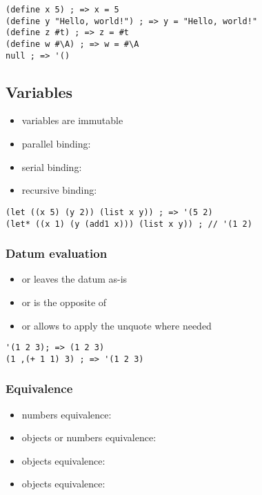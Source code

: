\documentclass[a4paper,landscape,10pt]{article}
\begin{document}
\begin{multicols*}{2}
  \begin{lstlisting}[language=Racket]
(define x 5) ; => x = 5
(define y "Hello, world!") ; => y = "Hello, world!"
(define z #t) ; => z = #t
(define w #\A) ; => w = #\A
null ; => '()
\end{lstlisting}

  \subsection{Variables}

  \begin{itemize}
    \item variables are immutable
    \item parallel binding: 
    \item serial binding: 
    \item recursive binding: 
  \end{itemize}

  \begin{lstlisting}[language=Racket]
(let ((x 5) (y 2)) (list x y)) ; => '(5 2)
(let* ((x 1) (y (add1 x))) (list x y)) ; // '(1 2)
\end{lstlisting}

  \subsubsection{Datum evaluation}

  \begin{itemize}
    \item {} or  leaves the datum as-is
    \item {} or  is the opposite of 
    \item {} or  allows to apply the unquote where needed
  \end{itemize}

  \begin{lstlisting}[language=Racket]
'(1 2 3); => (1 2 3)
(1 ,(+ 1 1) 3) ; => '(1 2 3)
\end{lstlisting}

  \subsubsection{Equivalence}

  \begin{itemize}
    \item numbers equivalence: \iracket{=}
    \item objects or numbers equivalence: 
    \item objects equivalence: 
    \item objects equivalence: 
  \end{itemize}


\end{multicols*}
\end{document}
